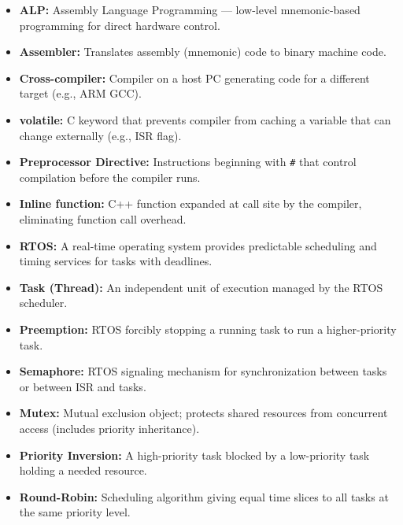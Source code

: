 \documentclass[12pt,a4paper]{article}
\begin{document}
\begin{tcolorbox}[defbox, title={\textbf{One-Line Definitions}}]
\begin{itemize}[leftmargin=*, itemsep=2.5pt, topsep=0pt]
  \item \textbf{ALP:} Assembly Language Programming --- low-level mnemonic-based programming for direct hardware control.
  \item \textbf{Assembler:} Translates assembly (mnemonic) code to binary machine code.
  \item \textbf{Cross-compiler:} Compiler on a host PC generating code for a different target (e.g., ARM GCC).
  \item \textbf{volatile:} C keyword that prevents compiler from caching a variable that can change externally (e.g., ISR flag).
  \item \textbf{Preprocessor Directive:} Instructions beginning with \texttt{\#} that control compilation before the compiler runs.
  \item \textbf{Inline function:} C++ function expanded at call site by the compiler, eliminating function call overhead.
  \item \textbf{RTOS:} A real-time operating system provides predictable scheduling and timing services for tasks with deadlines.
  \item \textbf{Task (Thread):} An independent unit of execution managed by the RTOS scheduler.
  \item \textbf{Preemption:} RTOS forcibly stopping a running task to run a higher-priority task.
  \item \textbf{Semaphore:} RTOS signaling mechanism for synchronization between tasks or between ISR and tasks.
  \item \textbf{Mutex:} Mutual exclusion object; protects shared resources from concurrent access (includes priority inheritance).
  \item \textbf{Priority Inversion:} A high-priority task blocked by a low-priority task holding a needed resource.
  \item \textbf{Round-Robin:} Scheduling algorithm giving equal time slices to all tasks at the same priority level.
\end{itemize}
\end{tcolorbox}
\end{document}
